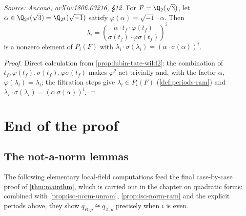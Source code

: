 \begin{corollary}[Explicit period, \(F = \Q_2(\sqrt 3)\)]
  \label{cor:period-wild2}
  \textit{Source: Ancona, arXiv:1806.03216, \S12.}
  For \(F = \Q_2(\sqrt 3)\), let \(\alpha \in \Q_{2^4}(\sqrt 3) =
  \Q_{2^4}(\sqrt{-1})\) satisfy \(\varphi(\alpha) = \sqrt{-1} \cdot \alpha\).
  Then
  \[\lambda_i = \left(\frac{\alpha \cdot t_f \cdot \varphi(t_f)}{\sigma(t_f)
    \cdot \varphi\sigma(t_f)}\right)^i\]
  is a nonzero element of \(P_i(F)\) with \(\lambda_i \cdot \sigma(\lambda_i) =
  (\alpha \cdot \sigma(\alpha))^i\).
\end{corollary}

\begin{proof}
  Direct calculation from \cref{prop:lubin-tate-wild2}: the combination of
  \(t_f, \varphi(t_f), \sigma(t_f), \varphi\sigma(t_f)\) makes \(\varphi^2\) act
  trivially and, with the factor \(\alpha\), \(\varphi(\lambda_i) = \lambda_i\);
  the filtration steps give \(\lambda_i \in P_i(F)\) (\cref{def:periods-ram}) and
  \(\lambda_i \cdot \sigma(\lambda_i) = (\alpha\,\sigma(\alpha))^i\).
\end{proof}

\section{End of the proof}

\subsection*{The not-a-norm lemmas}
\label{sec:not-norm}

The following elementary local-field computations feed the final case-by-case
proof of \cref{thm:mainthm}, which is carried out in the chapter on quadratic
forms: combined with \cref{prop:iso-norm-unram}, \cref{prop:iso-norm-ram} and
the explicit periods above, they show \(q_{B,p} \cong q_{Z,p}\) precisely when
\(i\) is even.

